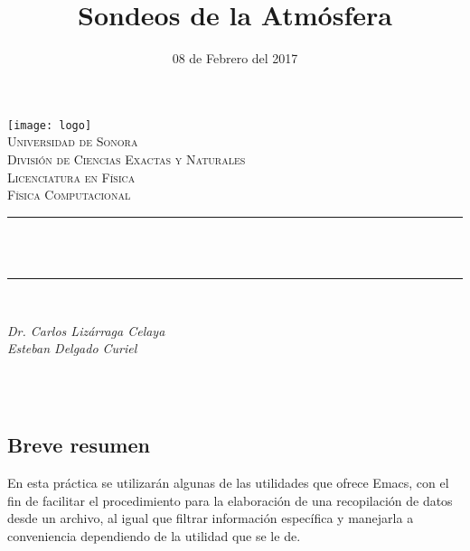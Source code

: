\documentclass[12pt]{article}
\title{Sondeos  de la Atmósfera}	%
\date{08 de Febrero del 2017} %
\makeatletter
\let\thetitle\@title
\let\thedate\@date
\makeatother
\begin{document}

\begin{titlepage}
	\centering
    \vspace*{0.5 cm}
    \texttt{[image: logo]}\\[0.5 cm]	%
    \textsc{\Large Universidad de Sonora}\\[0.5 cm]	%
	\textsc{\Large División de Ciencias Exactas y Naturales}\\[0.5 cm]				%
    \textsc{\Large Licenciatura en Física}\\[0.5 cm]	%
	\textsc{\large Física Computacional}\\[0.5 cm]	%
	\rule{\linewidth}{0.2 mm} \\[0.4 cm]
	{ \huge \bfseries \thetitle}\\
	\rule{\linewidth}{0.2 mm} \\[0.5 cm]
	
	\begin{minipage}{\textwidth}
		\begin{centering} 
			\emph{\Large  Dr. Carlos Lizárraga Celaya \\
            \vspace{0.5cm} Esteban Delgado Curiel} \\
			\end{centering}
            
	\end{minipage}\\[1 cm]
	{\large \thedate}\\[2 cm]
 
	\vfill
	
\end{titlepage}


\begin{center}
\section*{Breve resumen}
\end{center}
En esta práctica se utilizarán algunas de las utilidades que ofrece Emacs, con el fin de facilitar el procedimiento para la elaboración de una recopilación de datos desde un archivo, al igual que filtrar información específica y manejarla a conveniencia dependiendo de la utilidad que se le de. 
\end{document}
